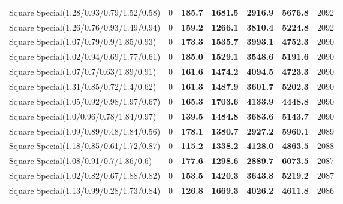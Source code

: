 \begin{tabular}{lrllllr}
 Square|Special(1.28/0.93/0.79/1.52/0.58)                      &             0   & \textbf{185.7} & \textbf{1681.5} & \textbf{2916.9} & \textbf{5676.8} &         2092 \\
 Square|Special(1.26/0.76/0.93/1.49/0.94)                      &             0   & \textbf{159.2} & \textbf{1266.1} & \textbf{3810.4} & \textbf{5224.8} &         2092 \\
 Square|Special(1.07/0.79/0.9/1.85/0.93)                       &             0   & \textbf{173.3} & \textbf{1535.7} & \textbf{3993.1} & \textbf{4752.3} &         2090 \\
 Square|Special(1.02/0.94/0.69/1.77/0.61)                      &             0   & \textbf{185.0} & \textbf{1529.1} & \textbf{3548.6} & \textbf{5191.6} &         2090 \\
 Square|Special(1.07/0.7/0.63/1.89/0.91)                       &             0   & \textbf{161.6} & \textbf{1474.2} & \textbf{4094.5} & \textbf{4723.3} &         2090 \\
 Square|Special(1.31/0.85/0.72/1.4/0.62)                       &             0   & \textbf{161.3} & \textbf{1487.9} & \textbf{3601.7} & \textbf{5202.3} &         2090 \\
 Square|Special(1.05/0.92/0.98/1.97/0.67)                      &             0   & \textbf{165.3} & \textbf{1703.6} & \textbf{4133.9} & \textbf{4448.8} &         2090 \\
 Square|Special(1.0/0.96/0.78/1.84/0.97)                       &             0   & \textbf{139.5} & \textbf{1484.8} & \textbf{3683.6} & \textbf{5143.7} &         2090 \\
 Square|Special(1.09/0.89/0.48/1.84/0.56)                      &             0   & \textbf{178.1} & \textbf{1380.7} & \textbf{2927.2} & \textbf{5960.1} &         2089 \\
 Square|Special(1.18/0.85/0.61/1.72/0.87)                      &             0   & \textbf{115.2} & \textbf{1338.2} & \textbf{4128.0} & \textbf{4863.5} &         2088 \\
 Square|Special(1.08/0.91/0.7/1.86/0.6)                        &             0   & \textbf{177.6} & \textbf{1298.6} & \textbf{2889.7} & \textbf{6073.5} &         2087 \\
 Square|Special(1.02/0.82/0.67/1.88/0.82)                      &             0   & \textbf{153.5} & \textbf{1420.3} & \textbf{3643.8} & \textbf{5219.2} &         2087 \\
 Square|Special(1.13/0.99/0.28/1.73/0.84)                      &             0   & \textbf{126.8} & \textbf{1669.3} & \textbf{4026.2} & \textbf{4611.8} &         2086 \\

\end{tabular}
